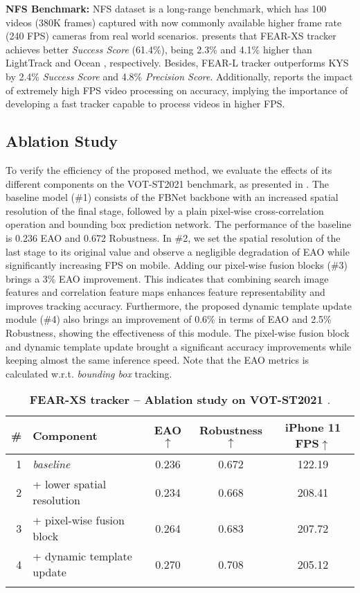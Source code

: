 \documentclass[runningheads]{llncs}
\begin{document}
\textbf{NFS Benchmark:} NFS \cite{nfs} dataset is a long-range benchmark, which has 100 videos (380K frames) captured with now commonly available higher frame rate (240 FPS) cameras from real world scenarios. 
 presents that FEAR-XS tracker achieves better \textit{Success Score} (61.4\%), being 2.3\% and 4.1\% higher than LightTrack \cite{LightTrack} and Ocean \cite{Ocean}, respectively. Besides, FEAR-L tracker outperforms KYS \cite{KYS} by 2.4\% \textit{Success Score} and 4.8\% \textit{Precision Score}. Additionally,  reports the impact of extremely high FPS video processing on accuracy, implying the importance of developing a fast tracker capable to process videos in higher FPS.



\subsection{Ablation Study}\label{section:ablations}

To verify the efficiency of the proposed method, we evaluate the effects of its different components on the VOT-ST2021 \cite{VOT} benchmark, as presented in . 
The baseline model (\#1) consists of the FBNet backbone with an increased spatial resolution of the final stage, followed by a plain pixel-wise cross-correlation operation and bounding box prediction network. 
The performance of the baseline is 0.236 EAO and 0.672 Robustness. In \#2, we set the spatial resolution of the last stage to its original value and observe a negligible degradation of EAO while significantly increasing FPS on mobile. 
Adding our pixel-wise fusion blocks (\#3) brings a 3\% EAO improvement. 
This indicates that combining search image features and correlation feature maps enhances feature representability and improves tracking accuracy. 
Furthermore, the proposed dynamic template update module (\#4) also brings an improvement of 0.6\% in terms of EAO and 2.5\% Robustness, showing the effectiveness of this module. The pixel-wise fusion block and dynamic template update brought a significant accuracy improvements while keeping almost the same inference speed.
Note that the EAO metrics is calculated w.r.t. \textit{bounding box} tracking.

\begin{table}[t!]
\small
\renewcommand{\arraystretch}{0.95}
\centering
\begin{tabular}{r|l|c|c|c}
\noalign{\smallskip}
\# & Component & \quad EAO$\uparrow$ \quad & Robustness$\uparrow$ & iPhone 11 FPS$\uparrow$\\
\hline
1 & \textit{baseline} & 0.236  & 0.672 & 122.19\\
2 & + lower spatial resolution & 0.234 & 0.668 & 208.41\\
3 & + pixel-wise fusion block & 0.264 & 0.683 & 207.72\\
4 & + dynamic template update & 0.270 & 0.708 & 205.12 \\
\noalign{\smallskip}
\end{tabular}
\caption{ \textbf{FEAR-XS tracker -- Ablation study on VOT-ST2021 \cite{VOT}}.
}
\label{t:ablation}
\end{table}
\end{document}
